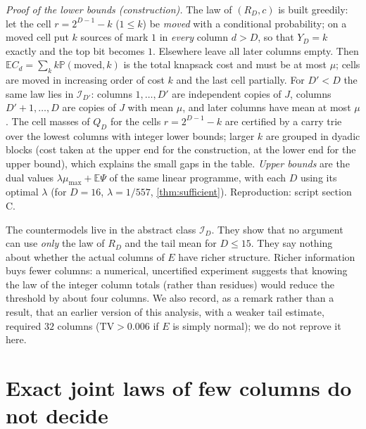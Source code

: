\documentclass[11pt]{article}
\renewcommand{\Pr}{\mathbb P}
\newcommand{\Ex}{\mathbb E}
\begin{document}
\emph{Proof of the lower bounds (construction).} The law of $(R_D,c)$ is built greedily: let the cell $r=2^{D-1}-k$ ($1\le k$) be \emph{moved} with a conditional probability; on a moved cell put $k$ sources of mark $1$ in \emph{every} column $d>D$, so that $Y_D=k$ exactly and the top bit becomes $1$. Elsewhere leave all later columns empty. Then $\Ex C_d=\sum_k k\Pr(\text{moved},k)$ is the total knapsack cost and must be at most $\mu$; cells are moved in increasing order of cost $k$ and the last cell partially. For $D'<D$ the same law lies in $\mathcal I_{D'}$: columns $1,\dots,D'$ are independent copies of $J$, columns $D'+1,\dots,D$ are copies of $J$ with mean $\mu$, and later columns have mean at most $\mu$. The cell masses of $Q_D$ for the cells $r=2^{D-1}-k$ are certified by a carry trie over the lowest columns with integer lower bounds; larger $k$ are grouped in dyadic blocks (cost taken at the upper end for the construction, at the lower end for the upper bound), which explains the small gaps in the table. \emph{Upper bounds} are the dual values $\lambda\mu_{\max}+\Ex\Psi$ of the same linear programme, with each $D$ using its optimal $\lambda$ (for $D=16$, $\lambda=1/557$, \cref{thm:sufficient}). Reproduction: script section C.

\begin{remark}
The countermodels live in the abstract class $\mathcal I_D$. They show that no argument can use \emph{only} the law of $R_D$ and the tail mean for $D\le15$. They say nothing about whether the actual columns of $E$ have richer structure. Richer information buys fewer columns: a numerical, uncertified experiment suggests that knowing the law of the integer column totals (rather than residues) would reduce the threshold by about four columns. We also record, as a remark rather than a result, that an earlier version of this analysis, with a weaker tail estimate, required $32$ columns ($\mathrm{TV}>0.006$ if $E$ is simply normal); we do not reprove it here.
\end{remark}

\section{Exact joint laws of few columns do not decide}\label{sec:hierarchy}
\end{document}
